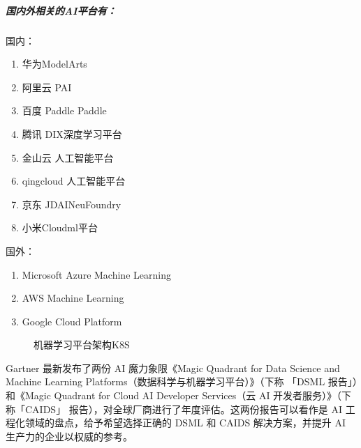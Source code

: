 \documentclass[letterpaper,10pt,english]{sphinxmanual}
\begin{document}
\subparagraph{国内外相关的AI平台有：}
\label{\detokenize{chapter_introduction/platform:id9}}
国内：
\begin{enumerate}
%
\item {} 
华为ModelArts

\item {} 
阿里云 PAI

\item {} 
百度 Paddle Paddle

\item {} 
腾讯 DI\sphinxhyphen{}X深度学习平台

\item {} 
金山云 人工智能平台

\item {} 
qingcloud 人工智能平台

\item {} 
京东 JDAINeuFoundry

\item {} 
小米Cloud\sphinxhyphen{}ml平台

\end{enumerate}

国外：
\begin{enumerate}
%
\item {} 
Microsoft Azure Machine Learning

\item {} 
AWS Machine Learning

\item {} 
Google Cloud Platform

\end{enumerate}

\begin{figure}[H]
\centering
\capstart

\noindent{}
\caption{机器学习平台架构\sphinxhyphen{}K8S\sphinxfootnotemark[136]}\label{\detokenize{chapter_introduction/platform:id17}}\end{figure}
%
\begin{footnotetext}[136]\sphinxAtStartFootnote
{}
%
\end{footnotetext}\ignorespaces 
Gartner 最新发布了两份 AI 魔力象限《Magic Quadrant for Data Science and
Machine Learning Platforms（数据科学与机器学习平台）》（下称 「DSML
报告」）和《Magic Quadrant for Cloud AI Developer Services（云 AI
开发者服务）》（下称「CAIDS」
报告），对全球厂商进行了年度评估。这两份报告可以看作是 AI
工程化领域的盘点，给予希望选择正确的 DSML 和 CAIDS 解决方案，并提升 AI
生产力的企业以权威的参考。
\end{document}
